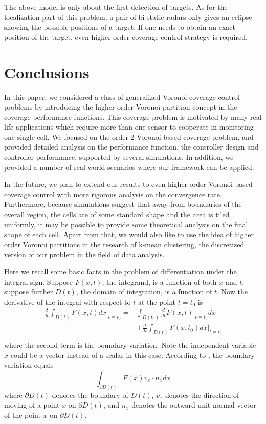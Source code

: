 \documentclass[letterpaper, 10 pt, conference]{ieeeconf}
\begin{document}
The above model is only about the first detection of targets. As for the localization part of this problem, a pair of bi-static radars only gives an eclipse showing the possible positions of a target. If one needs to obtain an exact position of the target, even higher order coverage control strategy is required.

\section{Conclusions}
In this paper, we considered a class of generalized Voronoi coverage control problems by introducing the higher order Voronoi partition concept in the coverage performance functions. This coverage problem is motivated by many real life applications which require more than one sensor to cooperate in monitoring one single cell. We focused on the order 2 Voronoi based coverage problem, and provided detailed analysis on the performance function, the controller design and controller performance, supported by several simulations.  In addition, we provided a number of real world scenarios where our framework can be applied.


In the future, we plan to extend our results to even higher order Voronoi-based coverage control
with more rigorous analysis on the convergence rate. Furthermore, because simulations suggest that away from boundaries of the overall region, the cells are of some standard shape and the area is tiled uniformly, it may be possible to provide some theoretical analysis on the final shape of each cell.
Apart from that, we would also like to use the idea of higher order Voronoi partitions in the research of k-mean clustering, the discretized version of our problem in the field of data analysis.

\begin{appendix}
Here we  recall some basic facts in the problem of differentiation under the integral sign. Suppose $F(x,t)$, the integrand, is a function of both $x$ and $t$; suppose further $D(t)$, the domain of integration, is a function of $t$. Now the derivative of the integral with respect to $t$ at the point $t=t_0$ is
\begin{equation}\label{sperate boundary}
\begin{split}
\frac{d}{dt}\int_{D(t)} F(x,t)dx \Big|_{t=t_0} =
&\int_{D(t_0)} \frac{d}{dt} F(x,t) \Big|_{t=t_0} dx\\
& + \frac{d}{dt}\int_{D(t)}  F(x,t_0)dx \Big|_{t=t_0}\\
\end{split}
\end{equation}
where the second term is the boundary variation. Note the independent variable $x$ could be a vector instead of a scalar in this case. According to \cite{flanders1973differentiation}, the boundary variation equals
$$\int_{\partial D(t)} F(x)v_x\cdot n_x dx$$
where $\partial D(t)$ denotes the boundary of $D(t)$, $v_x$ denotes the direction of moving of a point $x$ on $\partial D(t)$, and $n_x$ denotes the outward unit normal vector of the point $x$ on $\partial D(t)$.
\end{appendix}



\end{document}

